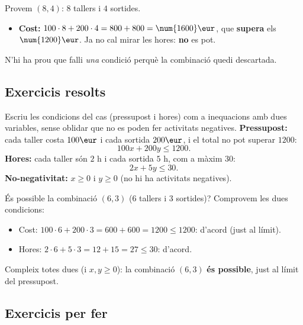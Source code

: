 \begin{exemple}
Provem $(8,4)$: $8$ tallers i $4$ sortides.
\begin{itemize}[leftmargin=1.4em, itemsep=2pt]
  \item \textbf{Cost:} $100\cdot 8+200\cdot 4=800+800=\num{1600}\eur$, que
        \textbf{supera} els $\num{1200}\eur$. Ja no cal mirar les hores: \textbf{no} es pot.
\end{itemize}
N'hi ha prou que falli \emph{una} condició perquè la combinació quedi descartada.
\end{exemple}

\subsection{Exercicis resolts}

\begin{exresolt}
Escriu les condicions del cas (pressupost i hores) com a inequacions amb dues
variables, sense oblidar que no es poden fer activitats negatives.
\solucio
\textbf{Pressupost:} cada taller costa $100\eur$ i cada sortida $200\eur$, i el total
no pot superar $\num{1200}$:
\[
100x+200y\le \num{1200}.
\]
\textbf{Hores:} cada taller són $2$ h i cada sortida $5$ h, com a màxim $30$:
\[
2x+5y\le 30.
\]
\textbf{No-negativitat:} $x\ge 0$ i $y\ge 0$ (no hi ha activitats negatives).
\end{exresolt}

\begin{exresolt}
És possible la combinació $(6,3)$ ($6$ tallers i $3$ sortides)?
\solucio
Comprovem les dues condicions:
\begin{itemize}[leftmargin=1.4em, itemsep=1pt]
  \item Cost: $100\cdot 6+200\cdot 3=600+600=\num{1200}\le\num{1200}$: d'acord (just al límit).
  \item Hores: $2\cdot 6+5\cdot 3=12+15=27\le 30$: d'acord.
\end{itemize}
Compleix totes dues (i $x,y\ge 0$): la combinació $(6,3)$ \textbf{és possible}, just al
límit del pressupost.
\end{exresolt}

\subsection{Exercicis per fer}


